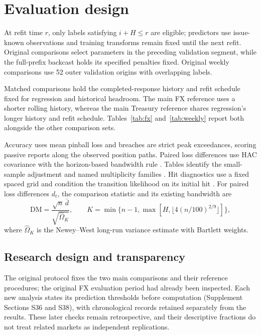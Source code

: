 \documentclass[11pt,a4paper]{article}
\begin{document}
\FloatBarrier

\section{Evaluation design}\label{sec:evaluation}

At refit time \(r\), only labels satisfying \(i+H\le r\) are eligible; predictors use issue-known observations and training transforms remain fixed until the next refit. Original comparisons select parameters in the preceding validation segment, while the full-prefix backcast holds its specified penalties fixed. Original weekly comparisons use 52 outer validation origins with overlapping labels.

Matched comparisons hold the completed-response history and refit schedule fixed for regression and historical headroom. The main FX reference uses a shorter rolling history, whereas the main Treasury reference shares regression's longer history and refit schedule. Tables~\ref{tab:fx} and~\ref{tab:weekly} report both alongside the other comparison sets.

Accuracy uses mean pinball loss and breaches are strict peak exceedances, scoring passive reports along the observed position paths. Paired loss differences use HAC covariance with the horizon-based bandwidth rule \citep{dm1995,nw1987}. Tables identify the small-sample adjustment and named multiplicity families \citep{hln1997,holm1979}. Hit diagnostics use a fixed spaced grid and condition the transition likelihood on its initial hit \citep{kupiec1995,christ1998}.
For paired loss differences \(d_t\), the comparison statistic and its existing bandwidth are
\[
\mathrm{DM}=\frac{\sqrt n\,\bar d}{\sqrt{\widehat\Omega_K}},\qquad
K=\min\{n-1,\max[H,\lfloor4(n/100)^{2/9}\rfloor]\},
\]
where \(\widehat\Omega_K\) is the Newey--West long-run variance estimate with Bartlett weights.


\subsection{Research design and transparency}

The original protocol fixes the two main comparisons and their reference procedures; the original FX evaluation period had already been inspected. Each new analysis states its prediction thresholds before computation (Supplement Sections S36 and S38), with chronological records retained separately from the results. These later checks remain retrospective, and their descriptive fractions do not treat related markets as independent replications.
\end{document}
